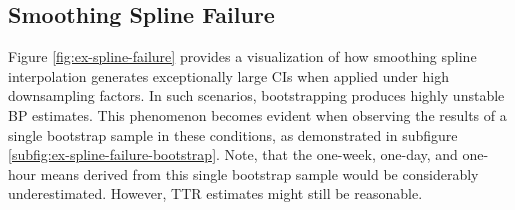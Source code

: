 \subsection{Smoothing Spline Failure}

Figure \ref{fig:ex-spline-failure} provides a visualization of how smoothing
spline interpolation generates exceptionally large CIs when
applied under high downsampling factors.
In such scenarios, bootstrapping produces highly unstable BP estimates.
This phenomenon becomes evident when observing the results of a single bootstrap
sample in these conditions, as demonstrated in subfigure \ref{subfig:ex-spline-failure-bootstrap}.
Note, that the one-week, one-day, and one-hour means derived from this single bootstrap sample
would be considerably underestimated.
However, TTR estimates might still be reasonable.


